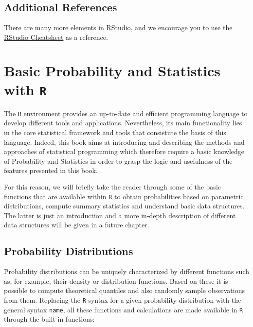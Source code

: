 \documentclass[]{book}
\theoremstyle{definition}
\theoremstyle{definition}
\theoremstyle{remark}
\begin{document}
\subsection{Additional References}\label{additional-references}

There are many more elements in RStudio, and we encourage you to use the
\href{https://www.rstudio.com/wp-content/uploads/2016/01/rstudio-IDE-cheatsheet.pdf}{RStudio
Cheatsheet} as a reference.

\section{\texorpdfstring{Basic Probability and Statistics with
\texttt{R}}{Basic Probability and Statistics with R}}\label{basic-probability-and-statistics-with-r}

The \texttt{R} environment provides an up-to-date and efficient
programming language to develop different tools and applications.
Nevertheless, its main functionality lies in the core statistical
framework and tools that consistute the basis of this language. Indeed,
this book aims at introducing and describing the methods and approaches
of statistical programming which therefore require a basic knowledge of
Probability and Statistics in order to grasp the logic and usefulness of
the features presented in this book.

For this reason, we will briefly take the reader through some of the
basic functions that are available within \texttt{R} to obtain
probabilities based on parametric distributions, compute summary
statistics and understand basic data structures. The latter is just an
introduction and a more in-depth description of different data
structures will be given in a future chapter.

\subsection{Probability Distributions}\label{probability-distributions}

Probability distributions can be uniquely characterized by different
functions such as, for example, their density or distribution functions.
Based on these it is possible to compute theoretical quantiles and also
randomly sample observations from them. Replacing the \texttt{R} syntax
for a given probability distribution with the general syntax
\texttt{name}, all these functions and calculations are made available
in \texttt{R} through the built-in functions:
\end{document}
